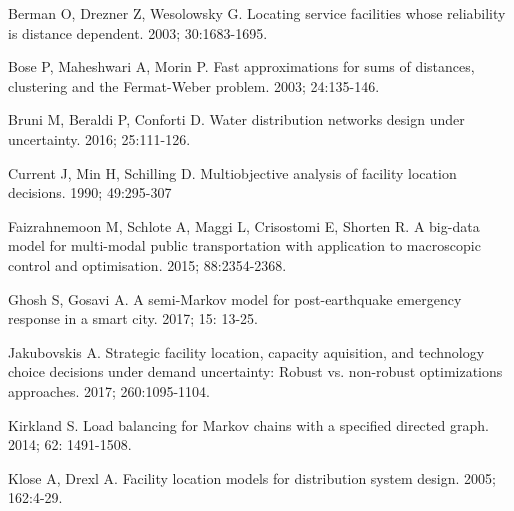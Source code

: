 \documentclass[twoside,twocolumn]{article}
\begin{document}
\begin{thebibliography}{99}

Berman O, Drezner Z, Wesolowsky G.
\newblock Locating service facilities whose reliability is distance dependent.
 2003; 30:1683-1695.

Bose P, Maheshwari A, Morin P.
\newblock Fast approximations for sums of distances, clustering and the Fermat-Weber problem.
 2003; 24:135-146.

Bruni M, Beraldi P, Conforti D.
\newblock Water distribution networks design under uncertainty.
 2016; 25:111-126.

Current J, Min H, Schilling D.
\newblock Multiobjective analysis of facility location decisions.
 1990; 49:295-307

Faizrahnemoon M, Schlote A, Maggi L, Crisostomi E, Shorten R.
\newblock A big-data model for multi-modal public transportation with application to macroscopic control and optimisation.
 2015; 88:2354-2368.

Ghosh S, Gosavi A.
\newblock A semi-Markov model for post-earthquake emergency response in a smart city.
 2017; 15: 13-25.

Jakubovskis A.
\newblock Strategic facility location, capacity aquisition, and technology choice decisions under demand uncertainty: Robust vs. non-robust optimizations approaches.
 2017; 260:1095-1104.

Kirkland S.
\newblock Load balancing for Markov chains with a specified directed graph.
 2014; 62: 1491-1508.

Klose A, Drexl A.
\newblock Facility location models for distribution system design.
 2005; 162:4-29.


\end{thebibliography}
\end{document}
